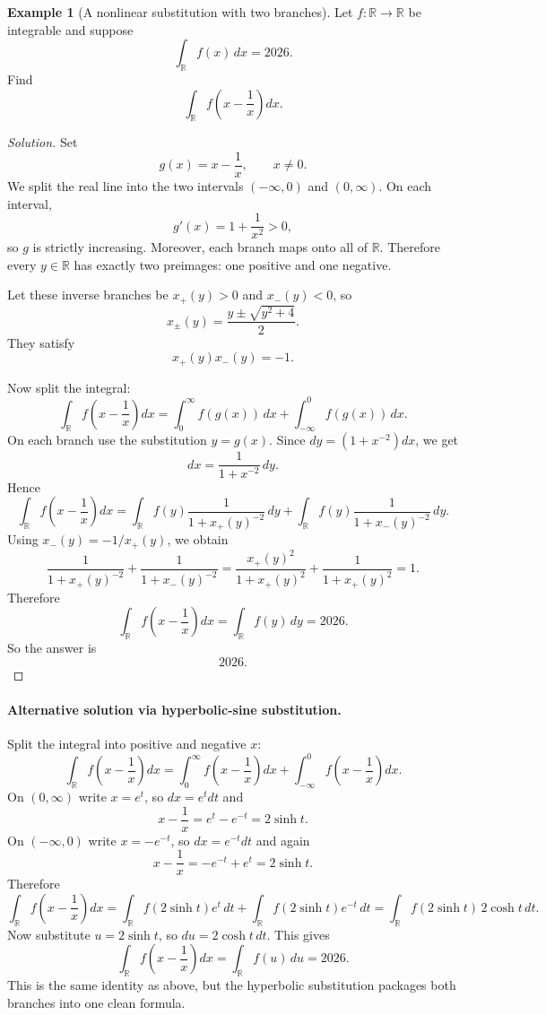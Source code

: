\documentclass[11pt]{article}
\theoremstyle{definition}
\newtheorem{example}{Example}[section]
\newcommand{\R}{\mathbb{R}}
\begin{document}
\begin{example}[A nonlinear substitution with two branches]
Let $f:\R\to\R$ be integrable and suppose
\[
\int_{\R} f(x)\,dx = 2026.
\]
Find
\[
\int_{\R} f\!\left(x-\frac{1}{x}\right)dx.
\]
\end{example}

\begin{proof}[Solution]
Set
\[
g(x)=x-\frac{1}{x}, \qquad x\neq 0.
\]
We split the real line into the two intervals $(-\infty,0)$ and $(0,\infty)$. On each interval,
\[
g'(x)=1+\frac{1}{x^2}>0,
\]
so $g$ is strictly increasing. Moreover, each branch maps onto all of $\R$. Therefore every $y\in\R$ has exactly two preimages: one positive and one negative.

Let these inverse branches be $x_+(y)>0$ and $x_-(y)<0$, so
\[
x_\pm(y)=\frac{y\pm\sqrt{y^2+4}}{2}.
\]
They satisfy
\[
x_+(y)x_-(y)=-1.
\]

Now split the integral:
\[
\int_{\R} f\!\left(x-\frac{1}{x}\right)dx
= \int_0^{\infty} f(g(x))\,dx + \int_{-\infty}^0 f(g(x))\,dx.
\]
On each branch use the substitution $y=g(x)$. Since $dy=(1+x^{-2})dx$, we get
\[
dx = \frac{1}{1+x^{-2}}\,dy.
\]
Hence
\[
\int_{\R} f\!\left(x-\frac{1}{x}\right)dx
= \int_{\R} f(y)\frac{1}{1+x_+(y)^{-2}}\,dy
+ \int_{\R} f(y)\frac{1}{1+x_-(y)^{-2}}\,dy.
\]
Using $x_-(y)=-1/x_+(y)$, we obtain
\[
\frac{1}{1+x_+(y)^{-2}} + \frac{1}{1+x_-(y)^{-2}}
= \frac{x_+(y)^2}{1+x_+(y)^2} + \frac{1}{1+x_+(y)^2} = 1.
\]
Therefore
\[
\int_{\R} f\!\left(x-\frac{1}{x}\right)dx
= \int_{\R} f(y)\,dy = 2026.
\]
So the answer is
\[
\boxed{2026}.
\]
\end{proof}

\paragraph{Alternative solution via hyperbolic-sine substitution.}
Split the integral into positive and negative $x$:
\[
\int_{\R} f\!\left(x-\frac{1}{x}\right)dx
= \int_0^{\infty} f\!\left(x-\frac{1}{x}\right)dx + \int_{-\infty}^0 f\!\left(x-\frac{1}{x}\right)dx.
\]
On $(0,\infty)$ write $x=e^t$, so $dx=e^t dt$ and
\[
x-\frac{1}{x}=e^t-e^{-t}=2\sinh t.
\]
On $(-\infty,0)$ write $x=-e^{-t}$, so $dx=e^{-t}dt$ and again
\[
x-\frac{1}{x}=-e^{-t}+e^t=2\sinh t.
\]
Therefore
\[
\int_{\R} f\!\left(x-\frac{1}{x}\right)dx
= \int_{\R} f(2\sinh t)e^t\,dt + \int_{\R} f(2\sinh t)e^{-t}\,dt
= \int_{\R} f(2\sinh t)\,2\cosh t\,dt.
\]
Now substitute $u=2\sinh t$, so $du=2\cosh t\,dt$. This gives
\[
\int_{\R} f\!\left(x-\frac{1}{x}\right)dx = \int_{\R} f(u)\,du = 2026.
\]
This is the same identity as above, but the hyperbolic substitution packages both branches into one clean formula.
\end{document}
